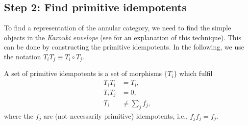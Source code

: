 {\subsection*{Step 2: Find primitive idempotents}

To find a representation of the annular category, we need to find the simple objects in the \emph{Karoubi envelope} (see \cite{barter_domain_2019} for an explanation of this technique). This can be done by constructing the primitive idempotents. In the following, we use the notation $T_iT_j\equiv T_i\circ T_j$.
	\begin{defn}
		A set of primitive idempotents is a set of morphisms $\{T_i\}$ which fulfil
			\begin{align}
				T_iT_i&=T_i,\\
				T_iT_j&=0,\\
				T_i&\neq \sum_jf_j,
			\end{align}
		where the $f_j$ are (not necessarily primitive) idempotents, i.e., $f_jf_j=f_j$.
	\end{defn}

}
